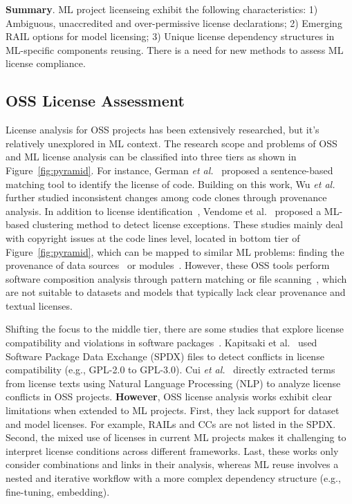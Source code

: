 \vspace{-2mm}
\begin{tcolorbox}
\textbf{Summary}.
ML project licenseing exhibit the following characteristics:
1) Ambiguous, unaccredited and over-permissive license declarations;
2) Emerging RAIL options for model licensing;
3) Unique license dependency structures in ML-specific components reusing.
There is a need for new methods to assess ML license compliance.
\end{tcolorbox}



\subsection{OSS License Assessment}
License analysis for OSS projects has been extensively researched, but it's relatively unexplored in ML context.
The research scope and problems of OSS and ML license analysis can be classified into three tiers as shown in Figure~\ref{fig:pyramid}.
For instance, German \textit{et al.}~\cite{german2010sentence} proposed a sentence-based matching tool to identify the license of code.
Building on this work, Wu \textit{et al.}~\cite{wu2017analysis} further studied inconsistent changes among code clones through provenance analysis.
In addition to license identification~\cite{jaeger2017fossology}, Vendome et al.~\cite{vendome2017machine} proposed a ML-based clustering method to detect license exceptions.
These studies mainly deal with copyright issues at the code lines level, located in bottom tier of Figure~\ref{fig:pyramid}, which can be mapped to similar ML problems: finding the provenance of data sources~\cite{rajbahadur2021can} or modules~\cite{chen2022copy}.
However, these OSS tools perform software composition analysis through pattern matching or file scanning~\cite{ombredanne2020free}, which are not suitable to datasets and models that typically lack clear provenance and textual licenses.

Shifting the focus to the middle tier, there are some studies that explore license compatibility and violations in software packages~\cite{mathur2012empirical, wu2015method}. 
Kapitsaki et al.~\cite{kapitsaki2017automating} used Software Package Data Exchange (SPDX) files to detect conflicts in license compatibility (e.g., GPL-2.0 to GPL-3.0).
Cui \textit{et al.}~\cite{cui2023empirical} directly extracted terms from license texts using Natural Language Processing (NLP) to analyze license conflicts in OSS projects.
\textbf{However}, OSS license analysis works exhibit clear limitations when extended to ML projects.
First, they lack support for dataset and model licenses. For example, RAILs and CCs are not listed in the SPDX. 
Second, the mixed use of licenses in current ML projects makes it challenging to interpret license conditions across different frameworks.
Last, these works only consider combinations and links in their analysis, whereas ML reuse involves a nested and iterative workflow with a more complex dependency structure (e.g., fine-tuning, embedding).

